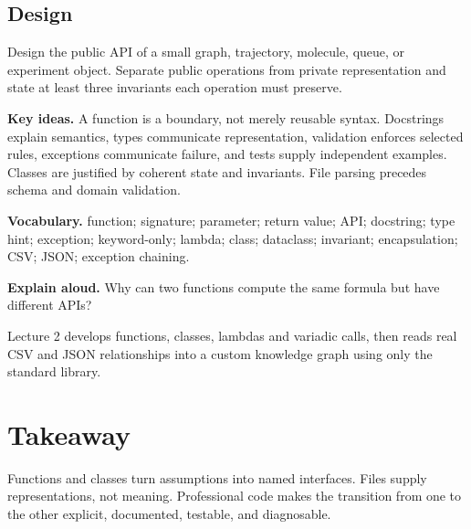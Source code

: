 \subsection*{Design}
Design the public API of a small graph, trajectory, molecule, queue, or
experiment object. Separate public operations from private representation and
state at least three invariants each operation must preserve.

\begin{chapterreview}
\textbf{Key ideas.} A function is a boundary, not merely reusable syntax.
Docstrings explain semantics, types communicate representation, validation
enforces selected rules, exceptions communicate failure, and tests supply
independent examples. Classes are justified by coherent state and invariants.
File parsing precedes schema and domain validation.

\textbf{Vocabulary.} function; signature; parameter; return value; API;
docstring; type hint; exception; keyword-only; lambda; class; dataclass;
invariant; encapsulation; CSV; JSON; exception chaining.

\textbf{Explain aloud.} Why can two functions compute the same formula but have
different APIs?
\end{chapterreview}

\begin{notebooklink}
Lecture 2 develops functions, classes, lambdas and variadic calls, then reads
real CSV and JSON relationships into a custom knowledge graph using only the
standard library.
\end{notebooklink}

\section{Takeaway}

Functions and classes turn assumptions into named interfaces. Files supply
representations, not meaning. Professional code makes the transition from one
to the other explicit, documented, testable, and diagnosable.

